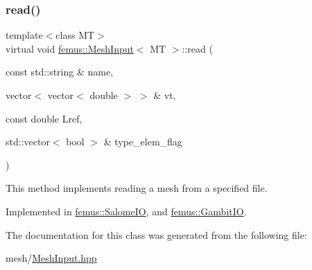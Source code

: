 \subsubsection{\texorpdfstring{read()}{read()}}
{\footnotesize\ttfamily template$<$class MT$>$ \\
virtual void \mbox{\hyperlink{classfemus_1_1_mesh_input}{femus\+::\+Mesh\+Input}}$<$ MT $>$\+::read (\begin{DoxyParamCaption}\item[{const std\+::string \&}]{name,  }\item[{vector$<$ vector$<$ double $>$ $>$ \&}]{vt,  }\item[{const double}]{Lref,  }\item[{std\+::vector$<$ bool $>$ \&}]{type\+\_\+elem\+\_\+flag }\end{DoxyParamCaption})\hspace{0.3cm}{\ttfamily [pure virtual]}}

This method implements reading a mesh from a specified file. 

Implemented in \mbox{\hyperlink{classfemus_1_1_salome_i_o_a2cd7f5327fe664747acc0131bf6a657e}{femus\+::\+Salome\+IO}}, and \mbox{\hyperlink{classfemus_1_1_gambit_i_o_a5457692b7562f09d2d14e9b16cfd4488}{femus\+::\+Gambit\+IO}}.



The documentation for this class was generated from the following file\+:\begin{DoxyCompactItemize}
\item 
mesh/\mbox{\hyperlink{_mesh_input_8hpp}{Mesh\+Input.\+hpp}}\end{DoxyCompactItemize}
